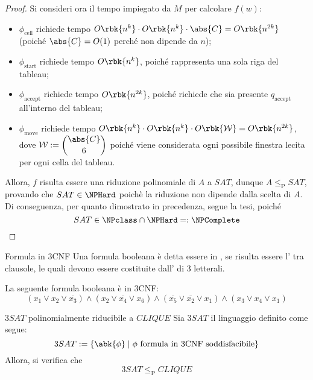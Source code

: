 \documentclass[a4paper, 12pt]{report}
\begin{document}
\begin{proof}
        Si consideri ora il tempo impiegato da $M$ per calcolare $f(w)$:

        \begin{itemize}
            \item $\phi_\mathrm{cell}$ richiede tempo $O\rbk{n^k} \cdot O\rbk{n^k} \cdot \abs{C} = O\rbk{n^{2k}}$ (poiché $\abs{C} = O(1)$ perché non dipende da $n$);
            \item $\phi_\mathrm{start}$ richiede tempo $O\rbk{n^k}$, poiché rappresenta una sola riga del tableau;
            \item $\phi_\mathrm{accept}$ richiede tempo $O\rbk{n^{2k}}$, poiché richiede che sia presente $q_\mathrm{accept}$ all'interno del tableau;
            \item $\phi_\mathrm{move}$ richiede tempo $O\rbk{n^{k}} \cdot O\rbk{n^k} \cdot O\rbk{\mathcal W} = O\rbk{n^{2k}}$, dove $\mathcal W := \displaystyle \binom{\abs{C}}{6}$ poiché viene considerata ogni possibile finestra lecita per ogni cella del tableau.
        \end{itemize}

        Allora, $f$ risulta essere una riduzione polinomiale di $A$ a $SAT$, dunque $A \leq_\mathrm P SAT$, provando che $SAT \in \NPHard$ poichè la riduzione non dipende dalla scelta di $A$. Di conseguenza, per quanto dimostrato in precedenza, segue la tesi, poiché $$SAT \in \NPclass \cap \NPHard =: \NPComplete$$
    \end{proof}

    \begin{frameddefn}{Formula in 3CNF}
        Una formula booleana è detta essere in , se risulta essere l' tra clausole, le quali devono essere costituite dall' di 3 letterali.
    \end{frameddefn}

    \begin{example}
        La seguente formula booleana è in 3CNF: $$(x_1 \lor x_2 \lor \overline{x_3}) \land (x_2 \lor \overline{x_4} \lor x_6) \land (\overline{x_5} \lor \overline{x_2} \lor x_1) \land (x_3 \lor x_4 \lor x_1)$$
    \end{example}

    \begin{framedthm}[label={3sat red clique}]{$3SAT$ polinomialmente riducibile a $CLIQUE$}
        Sia $3SAT$ il linguaggio definito come segue: $$3SAT := \{\abk{\phi} \mid \phi \ \textrm{formula in 3CNF soddisfacibile}\}$$ Allora, si verifica che $$3SAT \leq_\mathrm P CLIQUE$$
    \end{framedthm}
\end{document}
